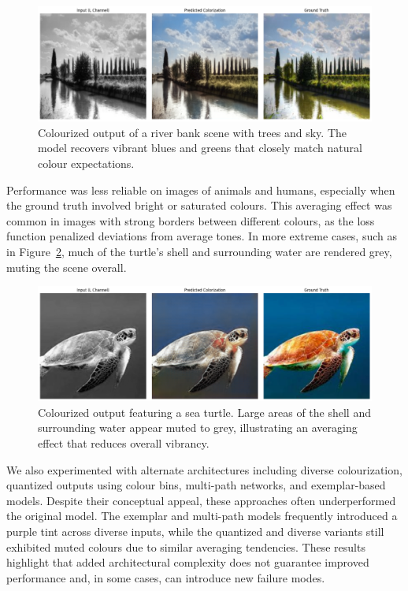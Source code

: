 \documentclass{article} %
\begin{document}
\begin{figure}[H]
  \centering
  \includegraphics[width=0.9\linewidth]{Figs/landscape-result-example.png}
  \caption{Colourized output of a river bank scene with trees and sky. The model recovers vibrant blues and greens that closely match natural colour expectations.}
  \label{fig:landscape_comparison}
\end{figure}

Performance was less reliable on images of animals and humans, especially when the ground truth involved bright or saturated colours. This averaging effect was common in images 
with strong borders between different colours, as the loss function penalized deviations from average tones. In more extreme cases, such as in Figure~\ref{fig:final-model-turtle}, 
much of the turtle's shell and surrounding water are rendered grey, muting the scene overall.

\begin{figure}[htbp]
  \centering
  \includegraphics[width=0.9\linewidth]{Figs/turtle-result-example.png}
  \caption{Colourized output featuring a sea turtle. Large areas of the shell and surrounding water appear muted to grey, illustrating an averaging effect that reduces overall vibrancy.}
  \label{fig:final-model-turtle}
\end{figure}

We also experimented with alternate architectures including diverse colourization, quantized outputs using colour bins, multi-path networks, and exemplar-based models. Despite their 
conceptual appeal, these approaches often underperformed the original model. The exemplar and multi-path models frequently introduced a purple tint across diverse inputs, while the 
quantized and diverse variants still exhibited muted colours due to similar averaging tendencies. These results highlight that added architectural complexity does not guarantee improved 
performance and, in some cases, can introduce new  failure modes.
\end{document}

